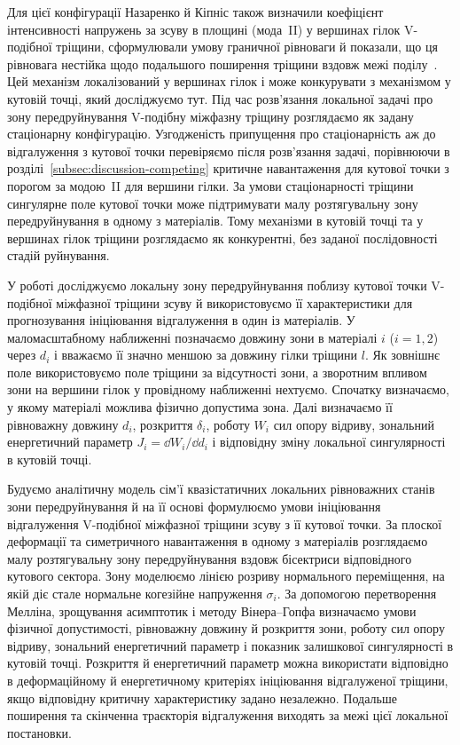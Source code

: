 Для цієї конфігурації Назаренко й Кіпніс також визначили коефіцієнт інтенсивності напружень за зсуву в площині (мода~II) у вершинах гілок V-подібної тріщини, сформулювали умову граничної рівноваги й показали, що ця рівновага нестійка щодо подальшого поширення тріщини вздовж межі поділу~\citeyearpar{NazarenkoKipnis2022Equilibrium}. Цей механізм локалізований у вершинах гілок і може конкурувати з механізмом у кутовій точці, який досліджуємо тут. Під час розв’язання локальної задачі про зону передруйнування V-подібну міжфазну тріщину розглядаємо як задану стаціонарну конфігурацію. Узгодженість припущення про стаціонарність аж до відгалуження з кутової точки перевіряємо після розв’язання задачі, порівнюючи в розділі~\ref{subsec:discussion-competing} критичне навантаження для кутової точки з порогом за модою~II для вершини гілки. За умови стаціонарності тріщини сингулярне поле кутової точки може підтримувати малу розтягувальну зону передруйнування в одному з матеріалів. Тому механізми в кутовій точці та у вершинах гілок тріщини розглядаємо як конкурентні, без заданої послідовності стадій руйнування.

У роботі досліджуємо локальну зону передруйнування поблизу кутової точки V-подібної міжфазної тріщини зсуву й використовуємо її характеристики для прогнозування ініціювання відгалуження в один із матеріалів. У маломасштабному наближенні позначаємо довжину зони в матеріалі $i$ ($i=1,2$) через $d_i$ і вважаємо її значно меншою за довжину гілки тріщини $l$. Як зовнішнє поле використовуємо поле тріщини за відсутності зони, а зворотним впливом зони на вершини гілок у провідному наближенні нехтуємо. Спочатку визначаємо, у якому матеріалі можлива фізично допустима зона. Далі визначаємо її рівноважну довжину $d_i$, розкриття $\delta_i$, роботу $W_i$ сил опору відриву, зональний енергетичний параметр $J_i=\dd W_i/\dd d_i$ і відповідну зміну локальної сингулярності в кутовій точці.

Будуємо аналітичну модель сім’ї квазістатичних локальних рівноважних станів зони передруйнування й на її основі формулюємо умови ініціювання відгалуження V-подібної міжфазної тріщини зсуву з її кутової точки. За плоскої деформації та симетричного навантаження в одному з матеріалів розглядаємо малу розтягувальну зону передруйнування вздовж бісектриси відповідного кутового сектора. Зону моделюємо лінією розриву нормального переміщення, на якій діє стале нормальне когезійне напруження $\sigma_i$. За допомогою перетворення Мелліна, зрощування асимптотик і методу Вінера--Гопфа визначаємо умови фізичної допустимості, рівноважну довжину й розкриття зони, роботу сил опору відриву, зональний енергетичний параметр і показник залишкової сингулярності в кутовій точці. Розкриття й енергетичний параметр можна використати відповідно в деформаційному й енергетичному критеріях ініціювання відгалуженої тріщини, якщо відповідну критичну характеристику задано незалежно. Подальше поширення та скінченна траєкторія відгалуження виходять за межі цієї локальної постановки.

